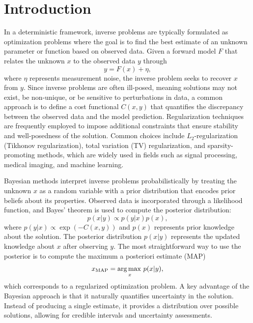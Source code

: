 \documentclass[11pt, twoside]{report}
\begin{document}
\chapter{Introduction}
In a deterministic framework, inverse problems are typically formulated as optimization problems where the goal is to find the best estimate of an unknown parameter or function based on observed data. Given a forward model $F$ that relates the unknown $x$ to the observed data $y$ through
\begin{equation} \label{x_opt}
y = F(x) + \eta,
\end{equation}
where $\eta$ represents measurement noise, the inverse problem seeks to recover $x$ from $y$. Since inverse problems are often ill-posed, meaning solutions may not exist, be non-unique, or be sensitive to perturbations in data, a common approach is to define a cost functional $C(x,y)$ that quantifies the discrepancy between the observed data and the model prediction. Regularization techniques are frequently employed to impose additional constraints that ensure stability and well-posedness of the solution. Common choices include $L_2$-regularization (Tikhonov regularization), total variation (TV) regularization, and sparsity-promoting methods, which are widely used in fields such as signal processing, medical imaging, and machine learning.

Bayesian methods interpret inverse problems probabilistically by treating the unknown $x$ as a random variable with a prior distribution that encodes prior beliefs about its properties. Observed data is incorporated through a likelihood function, and Bayes’ theorem is used to compute the posterior distribution:
\begin{equation}
p(x | y) \propto p(y | x) p(x),
\end{equation}
where $p(y | x) \propto \exp(-C(x,y))$ and $p(x)$ represents prior knowledge about the solution. The posterior distribution $p(x | y)$ represents the updated knowledge about $x$ after observing $y$. The most straightforward way to use the posterior is to compute the maximum a posteriori estimate (MAP)
\begin{equation} \label{x_map}
x_{\text{MAP}} = \operatorname*{arg\, max \,}_{x} p(x | y),
\end{equation}
which corresponds to a regularized optimization problem. A key advantage of the Bayesian approach is that it naturally quantifies uncertainty in the solution. Instead of producing a single estimate, it provides a distribution over possible solutions, allowing for credible intervals and uncertainty assessments. 
\end{document}
